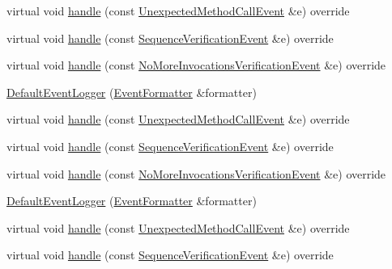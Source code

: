\begin{DoxyCompactItemize}
\item 
virtual void \mbox{\hyperlink{structfakeit_1_1DefaultEventLogger_a4bbb520dfe6bf042d7f0380e7b400bce}{handle}} (const \mbox{\hyperlink{structfakeit_1_1UnexpectedMethodCallEvent}{Unexpected\+Method\+Call\+Event}} \&e) override
\item 
virtual void \mbox{\hyperlink{structfakeit_1_1DefaultEventLogger_a730fe776b90249dd62d750a7d6171f90}{handle}} (const \mbox{\hyperlink{structfakeit_1_1SequenceVerificationEvent}{Sequence\+Verification\+Event}} \&e) override
\item 
virtual void \mbox{\hyperlink{structfakeit_1_1DefaultEventLogger_ac2df9faf9057e440c0aa314f54ce6f1c}{handle}} (const \mbox{\hyperlink{structfakeit_1_1NoMoreInvocationsVerificationEvent}{No\+More\+Invocations\+Verification\+Event}} \&e) override
\item 
\mbox{\hyperlink{structfakeit_1_1DefaultEventLogger_a20fe9266e4a323b5fc282d797fe7ecfd}{Default\+Event\+Logger}} (\mbox{\hyperlink{structfakeit_1_1EventFormatter}{Event\+Formatter}} \&formatter)
\item 
virtual void \mbox{\hyperlink{structfakeit_1_1DefaultEventLogger_a4bbb520dfe6bf042d7f0380e7b400bce}{handle}} (const \mbox{\hyperlink{structfakeit_1_1UnexpectedMethodCallEvent}{Unexpected\+Method\+Call\+Event}} \&e) override
\item 
virtual void \mbox{\hyperlink{structfakeit_1_1DefaultEventLogger_a730fe776b90249dd62d750a7d6171f90}{handle}} (const \mbox{\hyperlink{structfakeit_1_1SequenceVerificationEvent}{Sequence\+Verification\+Event}} \&e) override
\item 
virtual void \mbox{\hyperlink{structfakeit_1_1DefaultEventLogger_ac2df9faf9057e440c0aa314f54ce6f1c}{handle}} (const \mbox{\hyperlink{structfakeit_1_1NoMoreInvocationsVerificationEvent}{No\+More\+Invocations\+Verification\+Event}} \&e) override
\item 
\mbox{\hyperlink{structfakeit_1_1DefaultEventLogger_a20fe9266e4a323b5fc282d797fe7ecfd}{Default\+Event\+Logger}} (\mbox{\hyperlink{structfakeit_1_1EventFormatter}{Event\+Formatter}} \&formatter)
\item 
virtual void \mbox{\hyperlink{structfakeit_1_1DefaultEventLogger_a4bbb520dfe6bf042d7f0380e7b400bce}{handle}} (const \mbox{\hyperlink{structfakeit_1_1UnexpectedMethodCallEvent}{Unexpected\+Method\+Call\+Event}} \&e) override
\item 
virtual void \mbox{\hyperlink{structfakeit_1_1DefaultEventLogger_a730fe776b90249dd62d750a7d6171f90}{handle}} (const \mbox{\hyperlink{structfakeit_1_1SequenceVerificationEvent}{Sequence\+Verification\+Event}} \&e) override

\end{DoxyCompactItemize}
